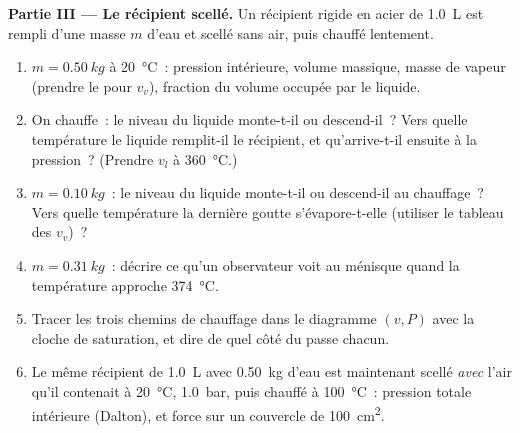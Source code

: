 \begin{problem}
\medskip
\noindent\textbf{Partie III --- Le récipient scellé.}
Un récipient rigide en acier de \qty{1.0}{L} est rempli d'une masse $m$ d'eau
et scellé sans air, puis chauffé lentement.
\begin{enumerate}[resume]
  \item $m = \qty{0.50}{kg}$ à \qty{20}{\degreeCelsius}~: pression intérieure,
        volume massique, masse de vapeur (prendre le  pour $v_v$),
        fraction du volume occupée par le liquide.
  \item On chauffe~: le niveau du liquide monte-t-il ou descend-il~? Vers
        quelle température le liquide remplit-il le récipient, et qu'arrive-t-il
        ensuite à la pression~? (Prendre $v_l$ à \qty{360}{\degreeCelsius}.)
  \item $m = \qty{0.10}{kg}$~: le niveau du liquide monte-t-il ou descend-il au
        chauffage~? Vers quelle température la dernière goutte s'évapore-t-elle
        (utiliser le tableau des $v_v$)~?
  \item $m = \qty{0.31}{kg}$~: décrire ce qu'un observateur voit au ménisque
        quand la température approche \qty{374}{\degreeCelsius}.
  \item Tracer les trois chemins de chauffage dans le diagramme $(v, P)$ avec
        la cloche de saturation, et dire de quel côté du  passe
        chacun.
  \item Le même récipient de \qty{1.0}{L} avec \qty{0.50}{kg} d'eau est
        maintenant scellé \emph{avec} l'air qu'il contenait à
        \qty{20}{\degreeCelsius}, \qty{1.0}{bar}, puis chauffé à
        \qty{100}{\degreeCelsius}~: pression totale intérieure (Dalton), et
        force sur un couvercle de \qty{100}{cm^2}.
\end{enumerate}


\end{problem}
